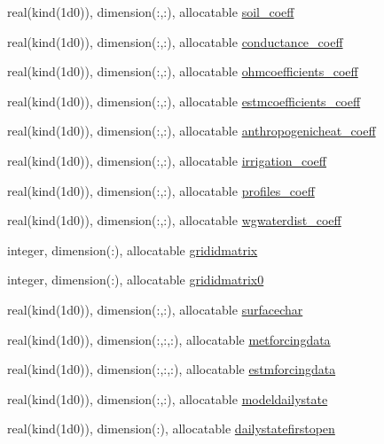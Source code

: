 \begin{DoxyCompactItemize}
real(kind(1d0)), dimension(\+:,\+:), allocatable \hyperlink{namespaceallocatearray_a61ef42dc2ae8e0b11fe76576d463f176}{soil\+\_\+coeff}
\item 
real(kind(1d0)), dimension(\+:,\+:), allocatable \hyperlink{namespaceallocatearray_a71b336f3aa2b306302e6bde6181deffc}{conductance\+\_\+coeff}
\item 
real(kind(1d0)), dimension(\+:,\+:), allocatable \hyperlink{namespaceallocatearray_ac7142ba3662e197598dceb16e1cc01be}{ohmcoefficients\+\_\+coeff}
\item 
real(kind(1d0)), dimension(\+:,\+:), allocatable \hyperlink{namespaceallocatearray_a7d74d9d08873f1a7215ac88608434548}{estmcoefficients\+\_\+coeff}
\item 
real(kind(1d0)), dimension(\+:,\+:), allocatable \hyperlink{namespaceallocatearray_a5288a5b9849ea3c057ec815db0858a9e}{anthropogenicheat\+\_\+coeff}
\item 
real(kind(1d0)), dimension(\+:,\+:), allocatable \hyperlink{namespaceallocatearray_ad5f029a4d718b470c2e33f000bde77f5}{irrigation\+\_\+coeff}
\item 
real(kind(1d0)), dimension(\+:,\+:), allocatable \hyperlink{namespaceallocatearray_afdc7bc9e6e97bc7071ef1fc93ea78856}{profiles\+\_\+coeff}
\item 
real(kind(1d0)), dimension(\+:,\+:), allocatable \hyperlink{namespaceallocatearray_a87e57bcd0e82e8977342bdfd009ffd37}{wgwaterdist\+\_\+coeff}
\item 
integer, dimension(\+:), allocatable \hyperlink{namespaceallocatearray_aaa33b997b1acf75030be64062214ccca}{grididmatrix}
\item 
integer, dimension(\+:), allocatable \hyperlink{namespaceallocatearray_a603f404abac892ea63b945352623553e}{grididmatrix0}
\item 
real(kind(1d0)), dimension(\+:,\+:), allocatable \hyperlink{namespaceallocatearray_a2949f0a79f6170fceeef0c4b023e219d}{surfacechar}
\item 
real(kind(1d0)), dimension(\+:,\+:,\+:), allocatable \hyperlink{namespaceallocatearray_aa263d396297f85dc10ee06a484ffcde6}{metforcingdata}
\item 
real(kind(1d0)), dimension(\+:,\+:,\+:), allocatable \hyperlink{namespaceallocatearray_aa23b27435b5039423f72672a260b1482}{estmforcingdata}
\item 
real(kind(1d0)), dimension(\+:,\+:), allocatable \hyperlink{namespaceallocatearray_aa7293bcc78f5a7d94634e14eeabaa810}{modeldailystate}
\item 
real(kind(1d0)), dimension(\+:), allocatable \hyperlink{namespaceallocatearray_a17d36472decf8d3a565e2fa091414748}{dailystatefirstopen}

\end{DoxyCompactItemize}
